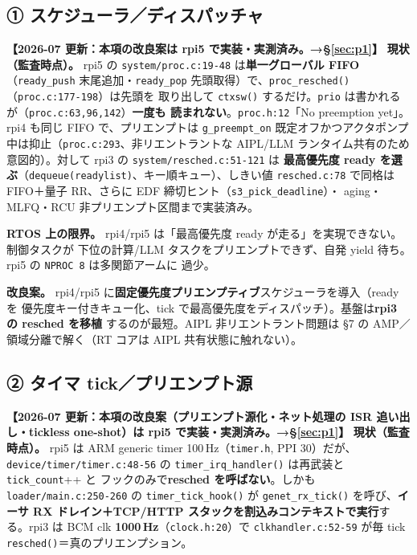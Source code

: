 \documentclass[11pt,a4paper]{article}
\newcommand{\code}[1]{\texttt{\small #1}}
\newcommand{\limt}[1]{\textbf{\textcolor{red!55!black}{#1}}}
\newcommand{\fix}[1]{\textbf{\textcolor{green!35!black}{#1}}}
\begin{document}
\subsection{① スケジューラ／ディスパッチャ}
\fix{【2026-07 更新：本項の改良案は rpi5 で実装・実測済み。→§\ref{sec:p1}】}
\textbf{現状（監査時点）。} rpi5 の \code{system/proc.c:19-48} は\textbf{単一グローバル FIFO}（\code{ready\_push}
末尾追加・\code{ready\_pop} 先頭取得）で、\code{proc\_resched()}（\code{proc.c:177-198}）は先頭を
取り出して \code{ctxsw()} するだけ。\code{prio} は書かれるが（\code{proc.c:63,96,142}）\textbf{一度も
読まれない}。\code{proc.h:12}「No preemption yet」。rpi4 も同じ FIFO で、プリエンプトは
\code{g\_preempt\_on} 既定オフかつアクタポンプ中は抑止（\code{proc.c:293}、非リエントラントな
AIPL/LLM ランタイム共有のため意図的）。対して rpi3 の \code{system/resched.c:51-121} は
\textbf{最高優先度 ready を選ぶ}（\code{dequeue(readylist)}、キー順キュー）、しきい値
\code{resched.c:78} で同格は FIFO＋量子 RR、さらに EDF 締切ヒント（\code{s3\_pick\_deadline}）・
aging・MLFQ・RCU 非プリエンプト区間まで実装済み。

\limt{RTOS 上の限界。} rpi4/rpi5 は「最高優先度 ready が走る」を実現できない。制御タスクが
下位の計算/LLM タスクをプリエンプトできず、自発 yield 待ち。rpi5 の \code{NPROC 8} は多関節アームに
過少。

\fix{改良案。} rpi4/rpi5 に\textbf{固定優先度プリエンプティブ}スケジューラを導入（ready を
優先度キー付きキュー化、tick で最高優先度をディスパッチ）。基盤は\textbf{rpi3 の resched を移植}
するのが最短。AIPL 非リエントラント問題は §7 の AMP／領域分離で解く（RT コアは AIPL 共有状態に触れない）。

\subsection{② タイマ tick／プリエンプト源}
\fix{【2026-07 更新：本項の改良案（プリエンプト源化・ネット処理の ISR 追い出し・tickless one-shot）は rpi5 で実装・実測済み。→§\ref{sec:p1}】}
\textbf{現状（監査時点）。} rpi5 は ARM generic timer 100\,Hz（\code{timer.h}, PPI 30）だが、
\code{device/timer/timer.c:48-56} の \code{timer\_irq\_handler()} は再武装と \code{tick\_count}++ と
フックのみで\textbf{resched を呼ばない}。しかも \code{loader/main.c:250-260} の
\code{timer\_tick\_hook()} が \code{genet\_rx\_tick()} を呼び、\textbf{イーサ RX ドレイン＋TCP/HTTP
スタックを割込みコンテキストで実行}する。rpi3 は BCM clk \textbf{1000\,Hz}（\code{clock.h:20}）で
\code{clkhandler.c:52-59} が毎 tick \code{resched()}＝真のプリエンプション。
\end{document}
